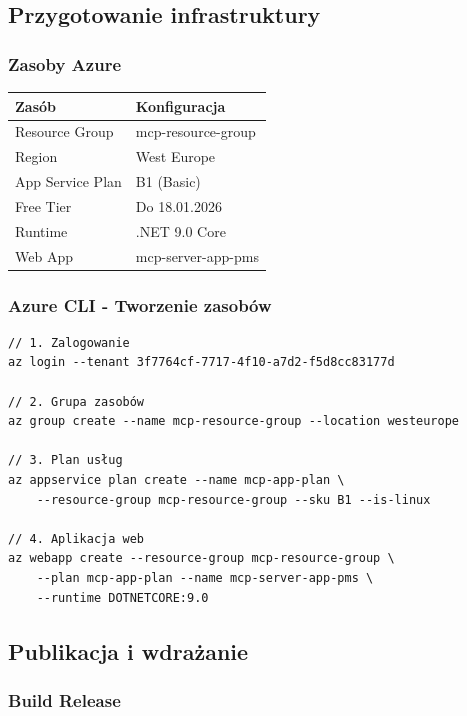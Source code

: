 \documentclass[twoside]{article}
\begin{document}
\subsection{Przygotowanie infrastruktury}

\subsubsection{Zasoby Azure}

\begin{table}[H]
	\centering
	\begin{tabular}{|l|l|}
		\hline
		\textbf{Zasób} & \textbf{Konfiguracja} \\
		\hline
		Resource Group & mcp-resource-group \\
		\hline
		Region & West Europe \\
		\hline
		App Service Plan & B1 (Basic) \\
		\hline
		Free Tier & Do 18.01.2026 \\
		\hline
		Runtime & .NET 9.0 Core \\
		\hline
		Web App & mcp-server-app-pms \\
		\hline
	\end{tabular}
\end{table}

\subsubsection{Azure CLI - Tworzenie zasobów}

\begin{verbatim}
// 1. Zalogowanie
az login --tenant 3f7764cf-7717-4f10-a7d2-f5d8cc83177d

// 2. Grupa zasobów
az group create --name mcp-resource-group --location westeurope

// 3. Plan usług
az appservice plan create --name mcp-app-plan \
	--resource-group mcp-resource-group --sku B1 --is-linux

// 4. Aplikacja web
az webapp create --resource-group mcp-resource-group \
	--plan mcp-app-plan --name mcp-server-app-pms \
	--runtime DOTNETCORE:9.0
\end{verbatim}

\subsection{Publikacja i wdrażanie}

\subsubsection{Build Release}
\end{document}
